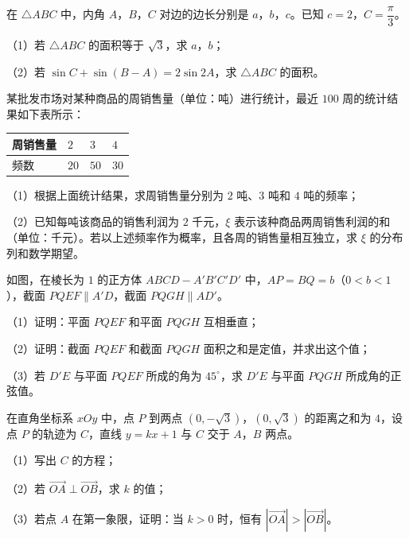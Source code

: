 \begin{question}
在 $\triangle ABC$ 中，内角 $A$，$B$，$C$ 对边的边长分别是 $a$，$b$，$c$。已知 $c=2$，$C=\dfrac{\pi}{3}$。

（1）若 $\triangle ABC$ 的面积等于 $\sqrt3$，求 $a$，$b$；

（2）若 $\sin C+\sin(B-A)=2\sin2A$，求 $\triangle ABC$ 的面积。

\end{question}
\begin{question}
某批发市场对某种商品的周销售量（单位：吨）进行统计，最近 $100$ 周的统计结果如下表所示：

\begin{center}
\begin{tabular}{llll}
\toprule
周销售量 & $2$ & $3$ & $4$ \\
\midrule
频数 & $20$ & $50$ & $30$ \\
\bottomrule
\end{tabular}
\end{center}

（1）根据上面统计结果，求周销售量分别为 $2$ 吨、$3$ 吨和 $4$ 吨的频率；

（2）已知每吨该商品的销售利润为 $2$ 千元，$\xi$ 表示该种商品两周销售利润的和（单位：千元）。若以上述频率作为概率，且各周的销售量相互独立，求 $\xi$ 的分布列和数学期望。

\Needspace{0.4\textheight}
\end{question}
\begin{question}
如图，在棱长为 $1$ 的正方体 $ABCD-A'B'C'D'$ 中，$AP=BQ=b$（$0<b<1$），截面 $PQEF\parallel A'D$，截面 $PQGH\parallel AD'$。

（1）证明：平面 $PQEF$ 和平面 $PQGH$ 互相垂直；

（2）证明：截面 $PQEF$ 和截面 $PQGH$ 面积之和是定值，并求出这个值；

（3）若 $D'E$ 与平面 $PQEF$ 所成的角为 $45^\circ$，求 $D'E$ 与平面 $PQGH$ 所成角的正弦值。
\nopagebreak[4]
\begin{center}\end{center}
\nopagebreak[4]
\end{question}
\begin{question}
在直角坐标系 $xOy$ 中，点 $P$ 到两点 $(0,-\sqrt3)$，$(0,\sqrt3)$ 的距离之和为 $4$，设点 $P$ 的轨迹为 $C$，直线 $y=kx+1$ 与 $C$ 交于 $A$，$B$ 两点。

（1）写出 $C$ 的方程；

（2）若 $\overrightarrow{OA}\perp\overrightarrow{OB}$，求 $k$ 的值；

（3）若点 $A$ 在第一象限，证明：当 $k>0$ 时，恒有 $\left|\overrightarrow{OA}\right|>\left|\overrightarrow{OB}\right|$。

\end{question}
